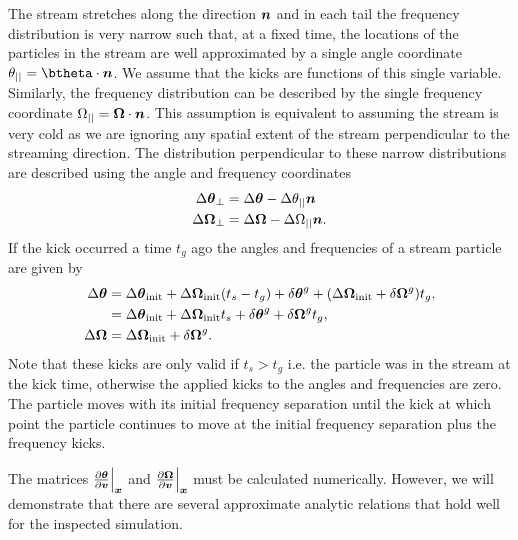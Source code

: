 \documentclass[useAMS,usenatbib,fleqn,a4paper]{mn2e}
\newcommand{\bs}[1]{\bmath{#1}}
\begin{document}
The stream stretches along the direction $\bs{n}$ and in each tail the frequency distribution is very narrow such that, at a fixed time, the locations of the particles in the stream are well approximated by a single angle coordinate $\theta_{||}=\btheta\cdot\bs{n}$. We assume that the kicks are functions of this single variable. Similarly, the frequency distribution can be described by the single frequency coordinate $\Omega_{||}=\boldsymbol{\Omega}\cdot\bs{n}$. This assumption is equivalent to assuming the stream is very cold as we are ignoring any spatial extent of the stream perpendicular to the streaming direction. The distribution perpendicular to these narrow distributions are described using the angle and frequency coordinates
\begin{equation}
\begin{split}
\Delta\boldsymbol{\theta}_\perp &= \Delta\boldsymbol{\theta}-\Delta\theta_{||}\bs{n}\\
\Delta\boldsymbol{\Omega}_\perp &= \Delta\boldsymbol{\Omega}-\Delta\Omega_{||}\bs{n}.
\end{split}
\end{equation}
If the kick occurred a time $t_g$ ago the angles and frequencies of a stream particle are given by
\begin{equation}\label{linearkickevol}
\begin{split}
\Delta\bs{\theta} &= \Delta\bs{\theta}_{\rm init}+\Delta\boldsymbol{\Omega}_{\rm init}(t_s-t_g)+\delta\bs{\theta}^g+(\Delta\boldsymbol{\Omega}_{\rm init}+\delta\boldsymbol{\Omega}^g)t_g , \\&= \Delta\bs{\theta}_{\rm init}+\Delta\boldsymbol{\Omega}_{\rm init}t_s+\delta\bs{\theta}^g+\delta\boldsymbol{\Omega}^g t_g,\\
\Delta\boldsymbol{\Omega} &= \Delta\boldsymbol{\Omega}_{\rm init}+\delta\boldsymbol{\Omega}^g.
\end{split}
\end{equation}
Note that these kicks are only valid if $t_s>t_g$ i.e. the particle was in the stream at the kick time, otherwise the applied kicks to the angles and frequencies are zero.
The particle moves with its initial frequency separation until the kick at which point the particle continues to move at the initial frequency separation plus the frequency kicks.

The matrices $\frac{\upartial \bs{\theta}}{\upartial \bs{v}}\Big|_{\bs{x}}$ and $\frac{\upartial \bs{\Omega}}{\upartial \bs{v}}\Big|_{\bs{x}}$ must be calculated numerically. However, we will demonstrate that there are several approximate analytic relations that hold well for the inspected simulation.
\end{document}
